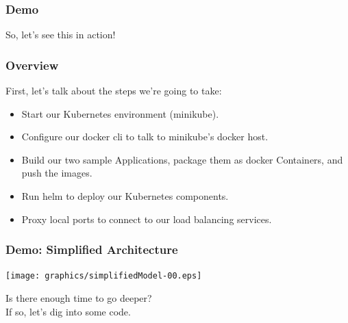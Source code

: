     \begin{frame}
        \frametitle{Demo}
        \begin{center}
            \Huge So, let's see this in action!
        \end{center}
    \end{frame}

    \begin{frame}
        \frametitle{Overview}
        First, let's talk about the steps we're going to take:
        \begin{itemize}
            \item Start our Kubernetes environment (minikube).\pause
            \item Configure our docker cli to talk to minikube's docker host.\pause
            \item Build our two sample Applications, package them as docker Containers, and push the images.\pause
            \item Run helm to deploy our Kubernetes components.\pause
            \item Proxy local ports to connect to our load balancing services.
        \end{itemize}
    \end{frame}

    \begin{frame}
        \frametitle{Demo: Simplified Architecture}
        \texttt{[image: graphics/simplifiedModel-00.eps]}
    \end{frame}

    \begin{frame}
        \begin{center}
            \Huge Is there enough time to go deeper?\\
            If so, let's dig into some code.
        \end{center}
    \end{frame}

